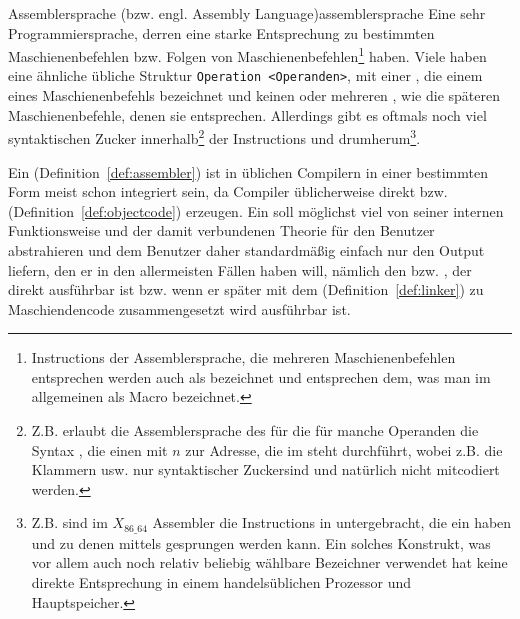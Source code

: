 \begin{Definition}{Assemblersprache (bzw. engl. Assembly Language)}{assemblersprache}
  Eine sehr  Programmiersprache, derren  eine starke Entsprechung zu bestimmten Maschienenbefehlen bzw. Folgen von Maschienenbefehlen\footnote{Instructions der Assemblersprache, die mehreren Maschienenbefehlen entsprechen werden auch als  bezeichnet und entsprechen dem, was man im allgemeinen als Macro bezeichnet.} haben.
  Viele  haben eine ähnliche übliche Struktur \verb|Operation <Operanden>|, mit einer , die einem  eines Maschienenbefehls bezeichnet und keinen oder mehreren , wie die späteren Maschienenbefehle, denen sie entsprechen. Allerdings gibt es oftmals noch viel \glqq syntaktischen Zucker\grqq\; innerhalb\footnote{Z.B. erlaubt die Assemblersprache des  für die  für manche Operanden die Syntax , die einen  mit  $n$ zur Adresse, die im   steht durchführt, wobei z.B. die Klammern \smalltt{()} usw. nur \glqq syntaktischer Zucker\grqq sind und natürlich nicht mitcodiert werden.} der Instructions und drumherum\footnote{Z.B. sind im $X_{86\_64}$ Assembler die Instructions in  untergebracht, die ein  haben und zu denen mittels   gesprungen werden kann. Ein solches Konstrukt, was vor allem auch noch relativ beliebig wählbare Bezeichner verwendet hat keine direkte Entsprechung in einem handelsüblichen Prozessor und Hauptspeicher.}.
\end{Definition}

Ein  (Definition~\ref{def:assembler}) ist in üblichen Compilern in einer bestimmten Form meist schon integriert sein, da Compiler üblicherweise direkt  bzw.  (Definition~\ref{def:objectcode}) erzeugen. Ein  soll möglichst viel von seiner internen Funktionsweise und der damit verbundenen Theorie für den Benutzer abstrahieren und dem Benutzer daher standardmäßig einfach nur den Output liefern, den er in den allermeisten Fällen haben will, nämlich den  bzw. , der direkt ausführbar ist bzw. wenn er später mit dem  (Definition~\ref{def:linker}) zu Maschiendencode zusammengesetzt wird ausführbar ist.

